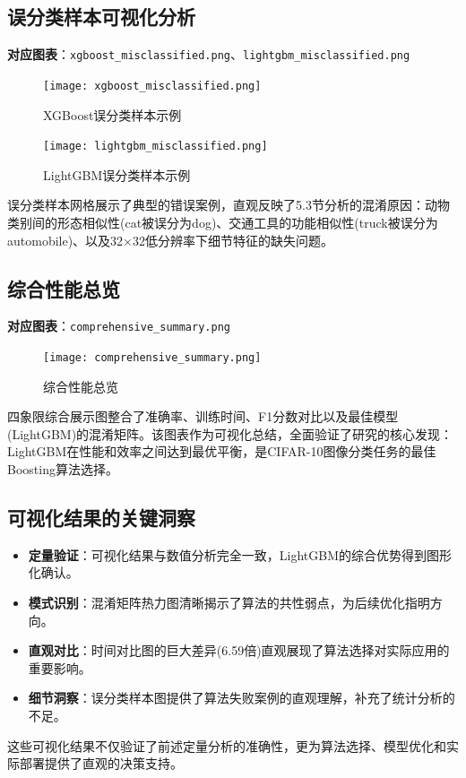 \documentclass[UTF8]{report}
\theoremstyle{MyLineTheoremStyle} %
\theoremstyle{MyBlockTheoremStyle} %
\theoremstyle{MySubsubsectionStyle} %
\begin{document}
\subsection{误分类样本可视化分析}
\textbf{对应图表}：\texttt{xgboost\_misclassified.png}、\texttt{lightgbm\_misclassified.png}
\begin{figure}[H]
    \centering
    \texttt{[image: xgboost\_misclassified.png]}
    \caption{XGBoost误分类样本示例}
\end{figure}
\begin{figure}[H]
    \centering
    \texttt{[image: lightgbm\_misclassified.png]}
    \caption{LightGBM误分类样本示例}
\end{figure}
误分类样本网格展示了典型的错误案例，直观反映了5.3节分析的混淆原因：动物类别间的形态相似性(cat被误分为dog)、交通工具的功能相似性(truck被误分为automobile)、以及32×32低分辨率下细节特征的缺失问题。

\subsection{综合性能总览}
\textbf{对应图表}：\texttt{comprehensive\_summary.png}
\begin{figure}[H]
    \centering
    \texttt{[image: comprehensive\_summary.png]}
    \caption{综合性能总览}
\end{figure}
四象限综合展示图整合了准确率、训练时间、F1分数对比以及最佳模型(LightGBM)的混淆矩阵。该图表作为可视化总结，全面验证了研究的核心发现：LightGBM在性能和效率之间达到最优平衡，是CIFAR-10图像分类任务的最佳Boosting算法选择。

\subsection{可视化结果的关键洞察}
\begin{itemize}
    \item \textbf{定量验证}：可视化结果与数值分析完全一致，LightGBM的综合优势得到图形化确认。
    \item \textbf{模式识别}：混淆矩阵热力图清晰揭示了算法的共性弱点，为后续优化指明方向。
    \item \textbf{直观对比}：时间对比图的巨大差异(6.59倍)直观展现了算法选择对实际应用的重要影响。
    \item \textbf{细节洞察}：误分类样本图提供了算法失败案例的直观理解，补充了统计分析的不足。
\end{itemize}
这些可视化结果不仅验证了前述定量分析的准确性，更为算法选择、模型优化和实际部署提供了直观的决策支持。
\end{document}

